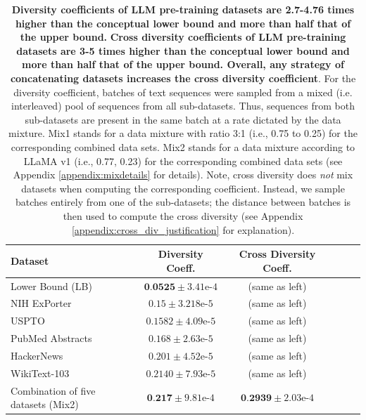 \documentclass[10pt]{article} %
\begin{document}
\begin{table}[t]
\caption{\textbf{Diversity coefficients of LLM pre-training datasets are 2.7-4.76 times higher than the conceptual lower bound and more than half that of the upper bound.}
\textbf{Cross diversity coefficients of LLM pre-training datasets are 3-5 times higher than the conceptual lower bound and more than half that of the upper bound.
Overall, any strategy of concatenating datasets increases the cross diversity coefficient}.
For the diversity coefficient, batches of text sequences were sampled from a mixed (i.e. interleaved) pool of sequences from all sub-datasets. Thus, sequences from both sub-datasets are present in the same batch at a rate dictated by the data mixture.
Mix1 stands for a data mixture with ratio 3:1 (i.e., 0.75 to 0.25) for the corresponding combined data sets.
Mix2 stands for a data mixture according to LLaMA v1 (i.e., 0.77, 0.23) for the corresponding combined data sets (see Appendix \ref{appendix:mixdetails} for details).
Note, cross diversity does \textit{not} mix datasets when computing the corresponding coefficient. Instead, we sample batches entirely from one of the sub-datasets; the distance between batches is then used to compute the cross diversity (see Appendix \ref{appendix:cross_div_justification} for explanation).
}
\vskip 0.15in
\begin{center}
\begin{small}
\begin{sc}
\begin{tabular}{lccccr}
\toprule
Dataset & Diversity Coeff. & Cross Diversity Coeff. \\
\midrule
Lower Bound (LB) & $\textbf{0.0525}\pm 3.41\textrm{e-}4$ & (same as left) \\

NIH ExPorter & $0.15 \pm 3.218\textrm{e-}5$ & (same as left)\\
USPTO & $0.1582 \pm 4.09\textrm{e-}5$ & (same as left) \\
PubMed Abstracts & $0.168 \pm 2.63\textrm{e-}5$ & (same as left) \\
HackerNews & $0.201 \pm 4.52\textrm{e-}5$ & (same as left) \\

WikiText-103 & $0.2140 \pm 7.93\textrm{e-}5$ & (same as left) \\

Combination of five datasets (Mix2) & $ \textbf{0.217} \pm 9.81\textrm{e-}4$ & $\textbf{0.2939} \pm 2.03\textrm{e-}4$ \\


\end{tabular}
\end{sc}
\end{small}
\end{center}
\end{table}
\end{document}

